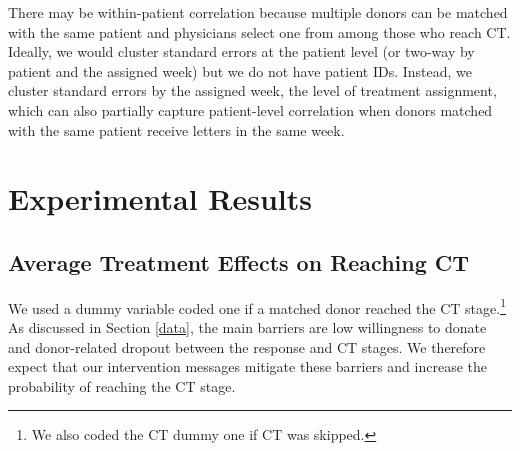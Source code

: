 \documentclass[12pt, a4paper]{article}
\begin{document}
There may be within-patient correlation because multiple donors can be matched with the same patient and physicians select one from among those who reach CT. Ideally, we would cluster standard errors at the patient level (or two-way by patient and the assigned week) but we do not have patient IDs. Instead, we cluster standard errors by the assigned week, the level of treatment assignment, which can also partially capture patient-level correlation when donors matched with the same patient receive letters in the same week.

\hypertarget{result}{%
\section{Experimental Results}\label{result}}

\hypertarget{main}{%
\subsection{Average Treatment Effects on Reaching CT}\label{main}}

We used a dummy variable coded one if a matched donor reached the CT stage.\footnote{We also coded the CT dummy one if CT was skipped.} As discussed in Section \ref{data}, the main barriers are low willingness to donate and donor-related dropout between the response and CT stages. We therefore expect that our intervention messages mitigate these barriers and increase the probability of reaching the CT stage.
\end{document}
